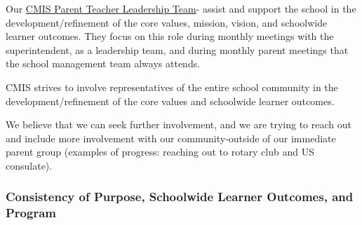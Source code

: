 \begin{findings}
Our \href{http://blogs.cmis.ac.th/ptg/about/}{CMIS Parent Teacher Leadership Team}- assist and support the school in the development/refinement of the core values, mission, vision, and schoolwide learner outcomes. They focus on this role during monthly meetings with the superintendent, as a leadership team, and during monthly parent meetings that the school management team always attends.


CMIS strives to involve representatives of the entire school community in the development/refinement of the core values and schoolwide learner outcomes.

We believe that we can seek further involvement, and we are trying to reach out and include more involvement with our community-outside of our immediate parent group (examples of progress: reaching out to rotary club and US consulate).
\end{findings}

\subsubsection{Consistency of Purpose, Schoolwide Learner Outcomes, and Program}



